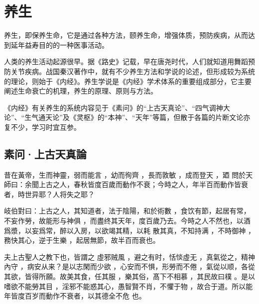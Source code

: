 \documentclass[draft,12pt]{ctexbook}
\begin{document}
\pagestyle{main2}
\fi
\chapter{养生}%
养生，即保养生命，它是通过各种方法，颐养生命，增强体质，预防疾病，从而达到延年益寿目的的一种医事活动。

人类的养生活动起源很早。据《路史》记载，早在唐尧时代，人们就知道用舞蹈预防关节疾病。战国秦汉著作中，就有不少养生方法和学说的论述，但形成较为系统的理论，则始于《内经》。养生学说是《内经》学术体系的重要组成部分，它主要阐述生命衰亡的机理，养生的原理、原则与方法。

《内经》有关养生的系统内容见于《素问》的“上古天真论”、“四气调神大论”、“生气通天论”及《灵枢》的“本神”、“天年”等篇，但散于各篇的片断文论亦复不少，学习时宜互参。

\section{素问·上古天真論}%


\begin{yuanwen}
昔在黃帝，生而神靈，弱而能言 ，幼而徇齊 ，長而敦敏 ，成而登天 ，廼 問於天師曰：余聞上古之人，春秋皆度百歲而動作不衰；今時之人，年半百而動作皆衰者，時世异耶？人将失之耶？

岐伯對曰：上古之人，其知道者，法于陰陽，和於術數 ，食饮有節，起居有常，不妄作勞，故能形与神俱 ，而盡终其天年，度百歲乃去。今時之人不然也，以酒爲漿，以妄爲常，醉以入房，以欲竭其精，以耗 散其真，不知持满 ，不時御神 ，務快其心，逆于生樂 ，起居無節，故半百而衰也。

夫上古聖人之教下也，皆謂之 虛邪贼風 ，避之有时，恬惔虛无 ，真氣從之，精神內守 ，病安从来？是以志閑而少欲 ，心安而不惧，形勞而不倦 ，氣從以顺，各從其欲，皆得所願。故美其食，任其服 ，樂其俗，髙下不相慕 ，其民故曰樸 。是以嗜欲不能勞其目 ，淫邪不能惑其心，愚智賢不肖，不懼于物 ，故合于道。所以能年皆度百岁而動作不衰者，以其德全不危 也。
\end{yuanwen}

\end{document}

